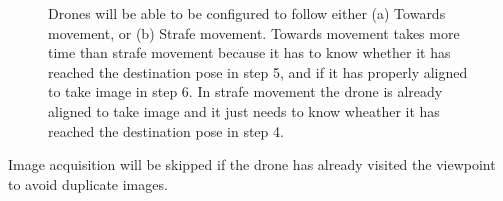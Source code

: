 \begin{figure}
	\centering
	\caption[Movement types for drones.]{\small 
		Drones will be able to be configured to follow either (a) Towards movement, or  (b) Strafe movement. Towards movement takes more time than strafe movement because it has to know whether it has reached the destination pose in step 5, and if it has properly aligned to take image in step 6. In strafe movement the drone is already aligned to take image and it just needs to know wheather it has reached the destination pose in step 4. }
	
	
	\label{fig:movement-types}
\end{figure}

Image acquisition will be skipped if the drone has already visited the viewpoint to avoid duplicate images.

